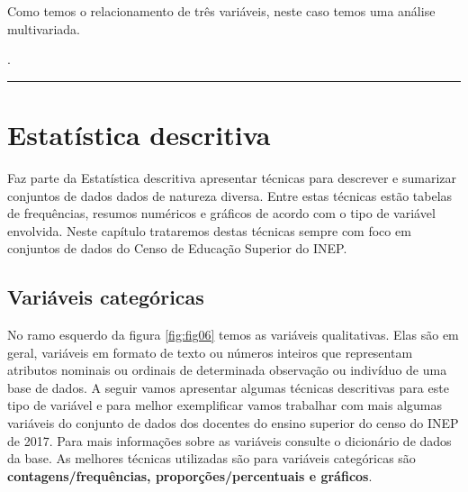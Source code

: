 \documentclass[12pt,]{style/krantz}
\makeatletter
\newenvironment{Shaded}{\begin{snugshade}}{\end{snugshade}}
\newcommand{\NormalTok}[1]{#1}
\newenvironment{kframe}{%
\medskip{}
\setlength{\fboxsep}{.8em}
 \def\at@end@of@kframe{}%
 \ifinner\ifhmode%
  \def\at@end@of@kframe{\end{minipage}}%
  \begin{minipage}{\columnwidth}%
 \fi\fi%
 \def\FrameCommand##1{\hskip\@totalleftmargin \hskip-\fboxsep
 \colorbox{shadecolor}{##1}\hskip-\fboxsep
     \hskip-\linewidth \hskip-\@totalleftmargin \hskip\columnwidth}%
 \MakeFramed {\advance\hsize-\width
   \@totalleftmargin\z@ \linewidth\hsize
   \@setminipage}}%
 {\par\unskip\endMakeFramed%
 \at@end@of@kframe}
\renewenvironment{Shaded}{\begin{kframe}}{\end{kframe}}
\theoremstyle{definition}
\theoremstyle{definition}
\theoremstyle{definition}
\theoremstyle{remark}
\let\BeginKnitrBlock\begin \let\EndKnitrBlock\end
\makeatother
\begin{document}
\BeginKnitrBlock{solution}
\iffalse{} {Solução. } \fi{}Como temos o relacionamento de três
variáveis, neste caso temos uma análise multivariada.
\EndKnitrBlock{solution}

\begin{Shaded}
\begin{Highlighting}[]
\NormalTok{.}
\end{Highlighting}
\end{Shaded}

\begin{center}\rule{0.5\linewidth}{\linethickness}\end{center}

\pagebreak

\chapter{Estatística descritiva}\label{estatistica-descritiva}

Faz parte da Estatística descritiva apresentar técnicas para descrever e
sumarizar conjuntos de dados dados de natureza diversa. Entre estas
técnicas estão tabelas de frequências, resumos numéricos e gráficos de
acordo com o tipo de variável envolvida. Neste capítulo trataremos
destas técnicas sempre com foco em conjuntos de dados do Censo de
Educação Superior do INEP.

\section{Variáveis categóricas}\label{variaveis-categoricas}

No ramo esquerdo da figura \ref{fig:fig06} temos as variáveis
qualitativas. Elas são em geral, variáveis em formato de texto ou
números inteiros que representam atributos nominais ou ordinais de
determinada observação ou indivíduo de uma base de dados. A seguir vamos
apresentar algumas técnicas descritivas para este tipo de variável e
para melhor exemplificar vamos trabalhar com mais algumas variáveis do
conjunto de dados dos docentes do ensino superior do censo do INEP de
2017. Para mais informações sobre as variáveis consulte o dicionário de
dados da base. As melhores técnicas utilizadas são para variáveis
categóricas são \textbf{contagens/frequências, proporções/percentuais e
gráficos}.
\end{document}
